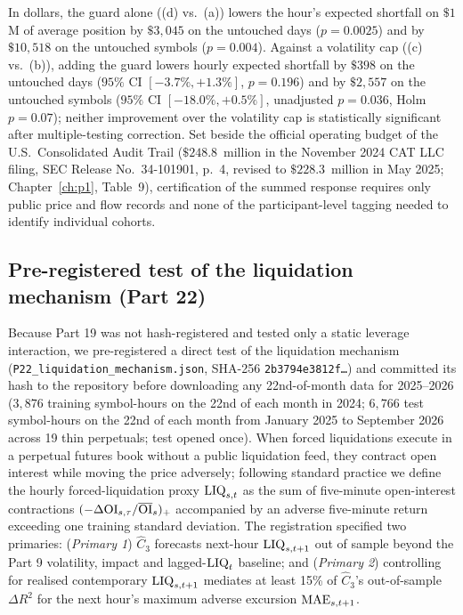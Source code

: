 In dollars, the guard alone ((d) vs.\ (a)) lowers the hour's expected shortfall on $\$1$M of average position by $\$3{,}045$ on the untouched days ($p=0.0025$) and by $\$10{,}518$ on the untouched symbols ($p=0.004$). Against a volatility cap ((c) vs.\ (b)), adding the guard lowers hourly expected shortfall by $\$398$ on the untouched days ($95\%$ CI $[-3.7\%,+1.3\%]$, $p=0.196$) and by $\$2{,}557$ on the untouched symbols ($95\%$ CI $[-18.0\%,+0.5\%]$, unadjusted $p=0.036$, Holm $p=0.07$); neither improvement over the volatility cap is statistically significant after multiple-testing correction. Set beside the official operating budget of the U.S.\ Consolidated Audit Trail ($\$248.8$~million in the November 2024 CAT LLC filing, SEC Release No.\ 34-101901, p.~4, revised to $\$228.3$~million in May 2025; Chapter~\ref{ch:p1}, Table~9), certification of the summed response requires only public price and flow records and none of the participant-level tagging needed to identify individual cohorts.

\subsection{Pre-registered test of the liquidation mechanism (Part 22)}\label{p2:sec:p22}
Because Part 19 was not hash-registered and tested only a static leverage interaction, we pre-registered a direct test of the liquidation mechanism (\texttt{P22\_liquidation\_mechanism.json}, SHA-256 \texttt{2b3794e3812f\ldots}) and committed its hash to the repository before downloading any 22nd-of-month data for 2025--2026 ($3{,}876$ training symbol-hours on the 22nd of each month in 2024; $6{,}766$ test symbol-hours on the 22nd of each month from January 2025 to September 2026 across 19 thin perpetuals; test opened once). When forced liquidations execute in a perpetual futures book without a public liquidation feed, they contract open interest while moving the price adversely; following standard practice we define the hourly forced-liquidation proxy ${\rm LIQ}_{s,t}$ as the sum of five-minute open-interest contractions $(-\Delta{\rm OI}_{s,\tau}/\overline{\rm OI}_s)_+$ accompanied by an adverse five-minute return exceeding one training standard deviation. The registration specified two primaries: (\emph{Primary 1}) $\hat C_3$ forecasts next-hour ${\rm LIQ}_{s,t+1}$ out of sample beyond the Part 9 volatility, impact and lagged-${\rm LIQ}_t$ baseline; and (\emph{Primary 2}) controlling for realised contemporary ${\rm LIQ}_{s,t+1}$ mediates at least 15\% of $\hat C_3$'s out-of-sample $\Delta R^2$ for the next hour's maximum adverse excursion ${\rm MAE}_{s,t+1}$.

